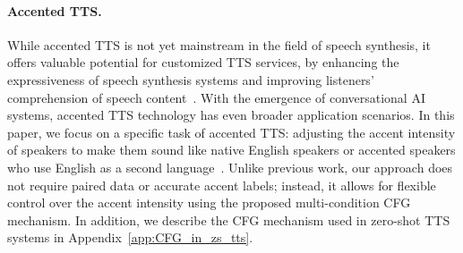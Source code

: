 \paragraph{Accented TTS.} While accented TTS is not yet mainstream in the field of speech synthesis, it offers valuable potential for customized TTS services, by enhancing the expressiveness of speech synthesis systems and improving listeners' comprehension of speech content~\citep{tan2021survey,melechovsky2022accented,badlani2023multilingual,zhou2024multi,shah2024parrottts,ma2023accent,inoue2024macst,zhong2024accentbox}. With the emergence of conversational AI systems, accented TTS technology has even broader application scenarios. In this paper, we focus on a specific task of accented TTS: adjusting the accent intensity of speakers to make them sound like native English speakers or accented speakers who use English as a second language~\citep{liu2024controllable}. Unlike previous work, our approach does not require paired data or accurate accent labels; instead, it allows for flexible control over the accent intensity using the proposed multi-condition CFG mechanism. In addition, we describe the CFG mechanism used in zero-shot TTS systems in Appendix~\ref{app:CFG_in_zs_tts}.